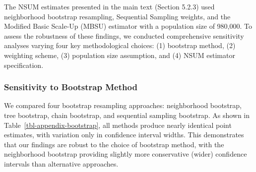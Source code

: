\documentclass[
  12pt,
  letterpaper,
  DIV=11,
  numbers=noendperiod]{scrartcl}
\theoremstyle{plain}
\theoremstyle{definition}
\begin{document}
The NSUM estimates presented in the main text (Section 5.2.3) used
neighborhood bootstrap resampling, Sequential Sampling weights, and the
Modified Basic Scale-Up (MBSU) estimator with a population size of
980,000. To assess the robustness of these findings, we conducted
comprehensive sensitivity analyses varying four key methodological
choices: (1) bootstrap method, (2) weighting scheme, (3) population size
assumption, and (4) NSUM estimator specification.

\subsubsection{Sensitivity to Bootstrap
Method}\label{sensitivity-to-bootstrap-method}

We compared four bootstrap resampling approaches: neighborhood
bootstrap, tree bootstrap, chain bootstrap, and sequential sampling
bootstrap. As shown in Table~\ref{tbl-appendix-bootstrap}, all methods
produce nearly identical point estimates, with variation only in
confidence interval widths. This demonstrates that our findings are
robust to the choice of bootstrap method, with the neighborhood
bootstrap providing slightly more conservative (wider) confidence
intervals than alternative approaches.
\end{document}
